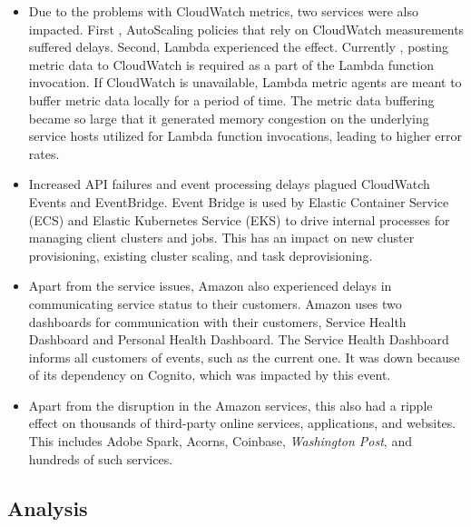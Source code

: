 \begin{itemize}
\item
\protect{}\label{fGqB2GXb4bJiSmeFB5AMT}
Due to the problems with CloudWatch metrics, two services were also impacted. First , AutoScaling policies that rely on CloudWatch measurements suffered delays. Second, Lambda experienced the effect. Currently
, posting metric data to CloudWatch is required as a part of the Lambda function invocation. If CloudWatch is unavailable, Lambda metric agents are meant to buffer metric data locally for a period of time. The metric data buffering became so large that it generated memory congestion on the underlying service hosts utilized for Lambda function invocations, leading to higher error rates.
\item
\protect{}\label{Bxfe_yPv2Cc5ueRvn1cDH}
Increased API failures and event processing delays plagued CloudWatch Events and EventBridge. Event Bridge is used by Elastic Container Service (ECS) and Elastic Kubernetes Service (EKS) to drive internal processes for managing client clusters and jobs. This has an impact on new cluster provisioning, existing cluster scaling, and task deprovisioning.\hspace{0pt}\hspace{0pt}
\item
\protect{}\label{OKIciaQKBLoZuQMszXGBC}
Apart from the service issues, Amazon also experienced delays in communicating service status to their customers. Amazon uses two dashboards for communication with their customers, Service Health Dashboard and Personal Health Dashboard. The Service Health Dashboard informs all customers of events, such as the current one. It was down because of its dependency on Cognito, which was impacted by this event.
\item
\protect{}\label{xffBmzsACWZ5En-GByMjl}
Apart from the disruption in the Amazon services, this also had a ripple effect on thousands of third-party online services, applications, and websites. This includes Adobe Spark, Acorns, Coinbase, \emph{Washington Post}, and hundreds of such services.
\end{itemize}

\subsection{Analysis}\label{INfZ0bJNySQ1AjgWyfsvA}


